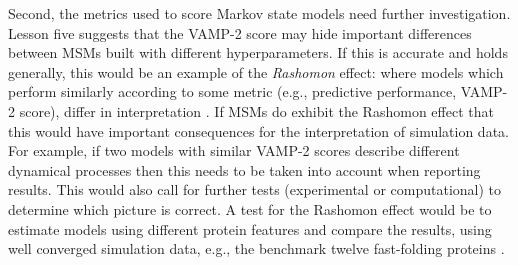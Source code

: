 Second, the metrics used to score Markov state models need further investigation.  Lesson five suggests that the VAMP-2 score may hide important differences between MSMs built with different hyperparameters. If this is accurate and holds generally, this would be an example of the \emph{Rashomon} effect: where models which perform similarly according to some metric (e.g., predictive performance, VAMP-2 score), differ in interpretation \cite{breiman2001}. If MSMs do exhibit the Rashomon effect that this would have important consequences for the interpretation of simulation data.  For example, if two models with similar VAMP-2 scores describe different dynamical processes then this needs to be taken into account when reporting results. This would also call for further tests (experimental or computational) to determine which picture is correct.  A test for the Rashomon effect would be to estimate models using different protein features and compare the results, using well converged simulation data, e.g., the benchmark twelve fast-folding proteins \cite{lindorff-larsenHowFastFoldingProteins2011a}. 

